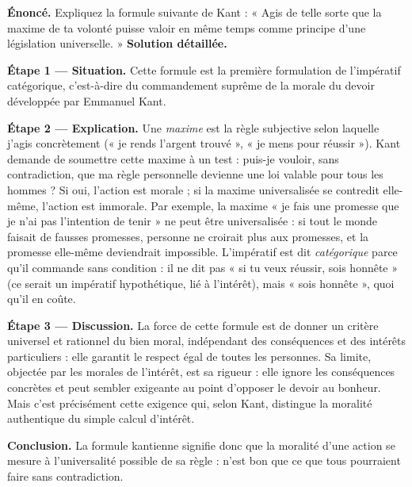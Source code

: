 \documentclass[11pt]{article}
\newcommand{\cle}[1]{{\popxbold\color{popdark}#1}}
\begin{document}
\begin{exoresolu}
\textbf{Énoncé.} Expliquez la formule suivante de Kant : « Agis de telle sorte que la maxime de ta volonté puisse valoir en même temps comme principe d'une législation universelle. »
\tcblower
\textbf{Solution détaillée.}

\textbf{Étape 1 — Situation.} Cette formule est la première formulation de l'\cle{impératif catégorique}, c'est-à-dire du commandement suprême de la morale du devoir développée par Emmanuel Kant.

\textbf{Étape 2 — Explication.} Une \emph{maxime} est la règle subjective selon laquelle j'agis concrètement (« je rends l'argent trouvé », « je mens pour réussir »). Kant demande de soumettre cette maxime à un test : puis-je vouloir, sans contradiction, que ma règle personnelle devienne une loi valable pour tous les hommes ? Si oui, l'action est morale ; si la maxime universalisée se contredit elle-même, l'action est immorale. Par exemple, la maxime « je fais une promesse que je n'ai pas l'intention de tenir » ne peut être universalisée : si tout le monde faisait de fausses promesses, personne ne croirait plus aux promesses, et la promesse elle-même deviendrait impossible. L'impératif est dit \emph{catégorique} parce qu'il commande sans condition : il ne dit pas « si tu veux réussir, sois honnête » (ce serait un impératif hypothétique, lié à l'intérêt), mais « sois honnête », quoi qu'il en coûte.

\textbf{Étape 3 — Discussion.} La force de cette formule est de donner un critère universel et rationnel du bien moral, indépendant des conséquences et des intérêts particuliers : elle garantit le respect égal de toutes les personnes. Sa limite, objectée par les morales de l'intérêt, est sa rigueur : elle ignore les conséquences concrètes et peut sembler exigeante au point d'opposer le devoir au bonheur. Mais c'est précisément cette exigence qui, selon Kant, distingue la moralité authentique du simple calcul d'intérêt.

\textbf{Conclusion.} La formule kantienne signifie donc que la moralité d'une action se mesure à l'universalité possible de sa règle : n'est bon que ce que tous pourraient faire sans contradiction.
\end{exoresolu}
\end{document}
